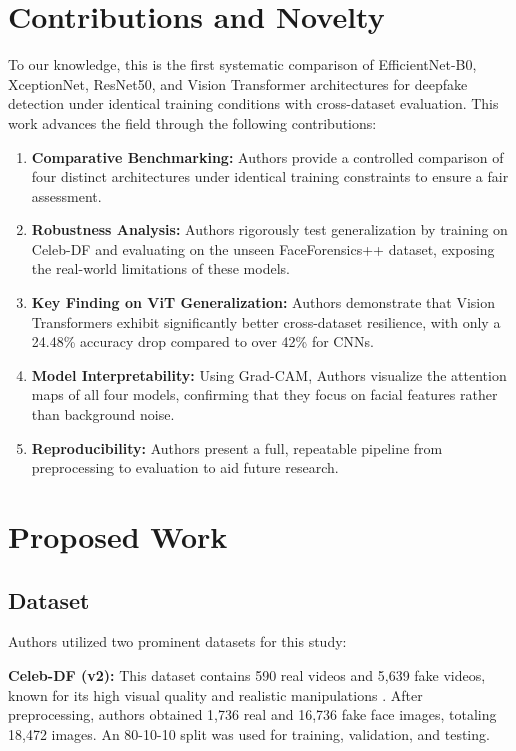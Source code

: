\documentclass[runningheads]{llncs}
\begin{document}
\section{Contributions and Novelty}
To our knowledge, this is the first systematic comparison of EfficientNet-B0, XceptionNet, ResNet50, and Vision Transformer architectures for deepfake detection under identical training conditions with cross-dataset evaluation. This work advances the field through the following contributions:

\begin{enumerate}
    \item \textbf{Comparative Benchmarking:} Authors provide a controlled comparison of four distinct architectures under identical training constraints to ensure a fair assessment.

    \item \textbf{Robustness Analysis:} Authors rigorously test generalization by training on Celeb-DF and evaluating on the unseen FaceForensics++ dataset, exposing the real-world limitations of these models.

    \item \textbf{Key Finding on ViT Generalization:} Authors demonstrate that Vision Transformers exhibit significantly better cross-dataset resilience, with only a 24.48\% accuracy drop compared to over 42\% for CNNs.

    \item \textbf{Model Interpretability:} Using Grad-CAM, Authors visualize the attention maps of all four models, confirming that they focus on facial features rather than background noise.

    \item \textbf{Reproducibility:} Authors present a full, repeatable pipeline from preprocessing to evaluation to aid future research.
\end{enumerate}

\section{Proposed Work}

\subsection{Dataset}
Authors utilized two prominent datasets for this study:

\textbf{Celeb-DF (v2):} This dataset contains 590 real videos and 5,639 fake videos, known for its high visual quality and realistic manipulations \cite{cross_dataset}. After preprocessing, authors obtained 1,736 real and 16,736 fake face images, totaling 18,472 images. An 80-10-10 split was used for training, validation, and testing.
\end{document}
